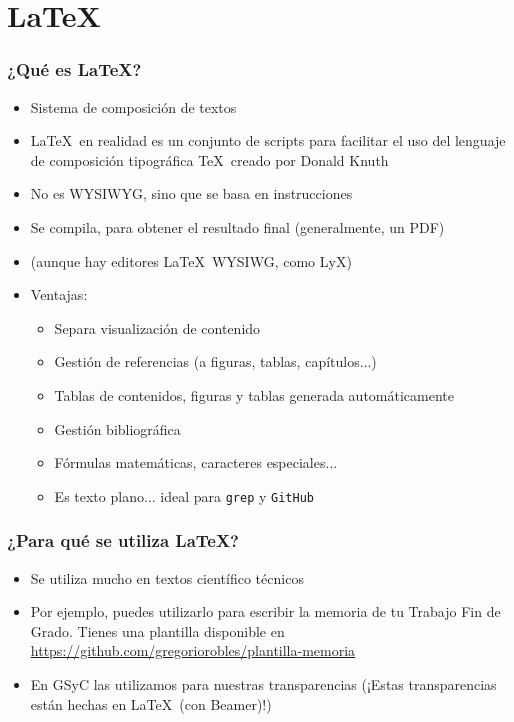 \section{\LaTeX}


\begin{frame}
\frametitle{¿Qué es \LaTeX ?}

\begin{itemize}
   \item Sistema de composición de textos
   \item \LaTeX\ en realidad es un conjunto de scripts para facilitar el uso del lenguaje de composición tipográfica \TeX\ creado por Donald Knuth
   \item No es WYSIWYG, sino que se basa en instrucciones
   \item Se compila, para obtener el resultado final (generalmente, un PDF)
   \item (aunque hay editores \LaTeX\ WYSIWG, como LyX)
   \item Ventajas:
   \begin{itemize}
     \item Separa visualización de contenido
     \item Gestión de referencias (a figuras, tablas, capítulos...)
     \item Tablas de contenidos, figuras y tablas generada automáticamente
     \item Gestión bibliográfica
     \item Fórmulas matemáticas, caracteres especiales...
     \item Es texto plano... ideal para \texttt{grep} y \texttt{GitHub}
   \end{itemize}
\end{itemize}

\end{frame}


\begin{frame}
\frametitle{¿Para qué se utiliza \LaTeX ?}

\begin{itemize}
   \item Se utiliza mucho en textos científico técnicos
   \item Por ejemplo, puedes utilizarlo para escribir la memoria de tu Trabajo Fin de Grado. Tienes una plantilla disponible en \url{https://github.com/gregoriorobles/plantilla-memoria}
   \item En GSyC las utilizamos para nuestras transparencias (¡Estas transparencias están hechas en \LaTeX\ (con Beamer)!)
\end{itemize}

\end{frame}


